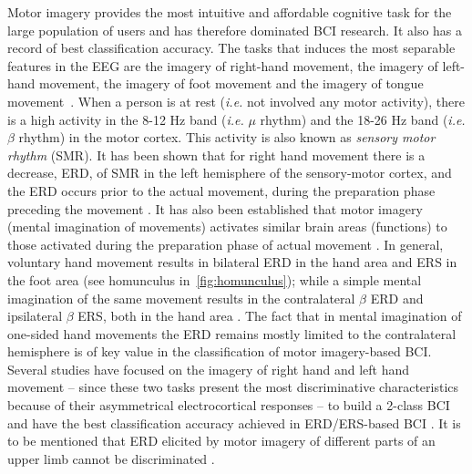 Motor imagery provides the most intuitive and affordable cognitive task for the large population of users and has therefore dominated BCI research. It also has a record of best classification accuracy. 
The tasks that induces the most separable features in the EEG are the imagery of right-hand movement, the imagery of left-hand movement, the imagery of foot movement and the imagery of tongue movement~\citep{ang_filter_2012}. 
When a person is at rest (\textit{i.e.} not involved any motor activity), there is a high  activity in the 8-12 Hz band (\textit{i.e.} $\mu$ rhythm) and the 18-26 Hz band (\textit{i.e.} $\beta$ rhythm) in the motor cortex. This activity is also known as \emph{sensory motor rhythm} (SMR).
It has been shown that for right hand movement there is a decrease, ERD, of SMR in the left hemisphere of
the sensory-motor cortex, and the ERD occurs prior to the actual movement, during the preparation phase preceding the movement \citep{pfurtscheller_event-related_1999}. 
It has also been established that motor imagery (mental imagination of movements) activates similar brain areas (functions) to those activated during the preparation phase of actual movement \citep{jeannerod_mental_1995, roland_supplementary_1980}.
In general, voluntary hand movement results in bilateral ERD in the hand area and ERS in the foot area (see homunculus in~\ref{fig:homunculus}); while a simple mental imagination of the same movement results  in the contralateral  $\beta$ ERD and ipsilateral $\beta$ ERS, both in the hand area \citep{pfurtscheller_existence_1997, pfurtscheller_event-related_1994, toro_c._and_deuschl_g_and_thatcher_r_and_sato_s._and_kufta_c_and_hallett_m._event-related_1994}.
The fact that in mental imagination of one-sided hand movements the ERD remains mostly limited to the contralateral hemisphere is of key value in the classification of motor imagery-based BCI. 
Several studies \citep{lotte_review_2007} have focused on the imagery of right hand and left hand movement -- since these two tasks present the most discriminative characteristics because of their asymmetrical electrocortical responses -- to build a 2-class BCI and have the best classification accuracy achieved in ERD/ERS-based BCI \citep{zhang_bci_2012}. 
It is to be mentioned that ERD elicited by motor imagery of different parts of an upper limb cannot be discriminated \citep{pfurtscheller_event-related_1999}. 
